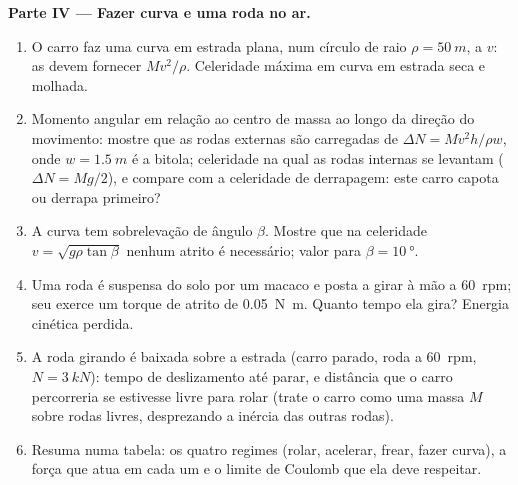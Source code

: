 \begin{problem}
\medskip
\noindent\textbf{Parte IV --- Fazer curva e uma roda no ar.}
\begin{enumerate}[resume]
  \item O carro faz uma curva em estrada plana, num círculo de raio
        $\rho = \qty{50}{m}$, a $v$: as  devem fornecer
        $Mv^2/\rho$. Celeridade máxima em curva em estrada seca e molhada.
  \item Momento angular em relação ao centro de massa ao longo da direção do
        movimento: mostre que as rodas externas são carregadas de $\Delta N =
        Mv^2h/\rho w$, onde $w = \qty{1.5}{m}$ é a bitola; celeridade na
        qual as rodas internas se levantam ($\Delta N = Mg/2$), e compare
        com a celeridade de derrapagem: este carro capota ou derrapa primeiro?
  \item A curva tem sobrelevação de ângulo $\beta$. Mostre que na celeridade
        $v = \sqrt{g\rho\tan\beta}$ nenhum atrito é necessário; valor
        para $\beta = \qty{10}{\degree}$.
  \item Uma roda é suspensa do solo por um macaco e posta a girar à mão a
        \qty{60}{rpm}; seu  exerce um torque de atrito de
        \qty{0.05}{N.m}. Quanto tempo ela gira? Energia cinética perdida.
  \item A roda girando é baixada sobre a estrada (carro parado, roda
        a \qty{60}{rpm}, $N = \qty{3}{kN}$): tempo de deslizamento até parar,
        e distância que o carro percorreria se estivesse livre para
        rolar (trate o carro como uma massa $M$ sobre rodas livres, desprezando
        a inércia das outras rodas).
  \item Resuma numa tabela: os quatro regimes (rolar, acelerar,
        frear, fazer curva), a força que atua em cada um e o
        limite de Coulomb que ela deve respeitar.
\end{enumerate}
\end{problem}
